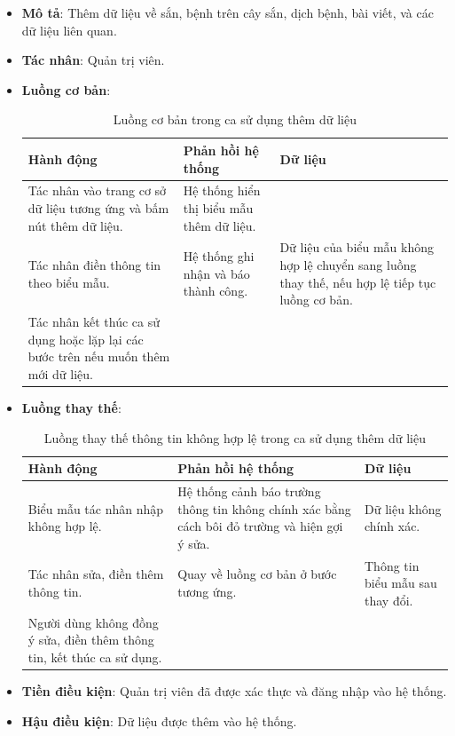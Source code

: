 \documentclass[./../main.tex]{subfiles}
\begin{document}
\begin{itemize}
    \item \textbf{Mô tả}: Thêm dữ liệu về sắn, bệnh trên cây sắn, dịch bệnh, bài viết, và các dữ liệu liên quan.
    \item \textbf{Tác nhân}: Quản trị viên.
    \item \textbf{Luồng cơ bản}:
    \begin{table}[H]
    \caption{\label{uc-45}Luồng cơ bản trong ca sử dụng thêm dữ liệu}
    \begin{tabularx}{\textwidth}{| X | X | X |}
        \hline
        \textbf{Hành động} & \textbf{Phản hồi hệ thống} & \textbf{Dữ liệu} 
        \\ \hline
         Tác nhân vào trang cơ sở dữ liệu tương ứng và bấm nút thêm dữ liệu. & Hệ thống hiển thị biểu mẫu thêm dữ liệu. & 
        \\ \hline
        Tác nhân điền thông tin theo biểu mẫu. & Hệ thống ghi nhận và báo thành công. & Dữ liệu của biểu mẫu không hợp lệ chuyển sang luồng thay thế, nếu hợp lệ tiếp tục luồng cơ bản.
        \\ \hline
        Tác nhân kết thúc ca sử dụng hoặc lặp lại các bước trên nếu muốn thêm mới dữ liệu. & &
        \\ \hline
    \end{tabularx}
    \end{table}    
    \item \textbf{Luồng thay thế}: 
        \begin{table}[H]
        \caption{\label{uc-46}Luồng thay thế thông tin không hợp lệ trong ca sử dụng thêm dữ liệu}
        \begin{tabularx}{\textwidth}{| X | X | X |}
            \hline
            \textbf{Hành động} & \textbf{Phản hồi hệ thống} & \textbf{Dữ liệu} \\ \hline
            Biểu mẫu tác nhân nhập không hợp lệ. & Hệ thống cảnh báo trường thông tin không chính xác bằng cách bôi đỏ trường và hiện gợi ý sửa. & Dữ liệu không chính xác.
            \\ \hline
            Tác nhân sửa, điền thêm thông tin. & Quay về luồng cơ bản ở bước tương ứng. & Thông tin biểu mẫu sau thay đổi.
            \\ \hline
            Người dùng không đồng ý sửa, điền thêm thông tin, kết thúc ca sử dụng. & & 
            \\ \hline
        \end{tabularx}
        \end{table}
    \item \textbf{Tiền điều kiện}: Quản trị viên đã được xác thực và đăng nhập vào hệ thống.
    \item \textbf{Hậu điều kiện}: Dữ liệu được thêm vào hệ thống.
\end{itemize}
\end{document}
